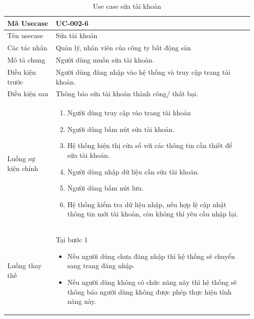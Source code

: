 \documentclass[12pt,a4paper]{article}
\begin{document}
    \begin{table}[H]
        \centering
        \begin{tabular}{|p{3.5cm}|p{11.5cm}|c|}
            \hline
            Mã Usecase      & UC-002-6                                                       \\
            \hline
            Tên usecase     & Sửa tài khoản                                                  \\
            \hline
            Các tác nhân    & Quản lý, nhân viên của công ty bất động sản                    \\
            \hline
            Mô tả chung     & Người dùng muốn sửa tài khoản.                                 \\
            \hline
            Điều kiện trước & Người dùng đăng nhập vào hệ thống và truy cập trang tài khoản. \\
            \hline
            Điều kiện sau   & Thông báo sửa tài khoản thành công/ thất bại.                  \\
            \hline
            Luồng sự kiện chính & \vspace{-.8cm}\begin{enumerate}
                                                    \item Người dùng truy cập vào trang tài khoản
                                                    \item  Người dùng bấm nút sửa tài khoản.
                                                    \item  Hệ thống hiện thị cửa sổ với các thông tin cần thiết để sửa tài khoản.
                                                    \item  Người dùng nhập dữ liệu cần sửa tài khoản.
                                                    \item Người dùng bấm nút lưu.
                                                    \item Hệ thống kiểm tra dữ liệu nhập, nếu hợp lệ cập nhật thông tin mới tài khoản, còn không thì yêu cầu nhập lại.
            \end{enumerate}
            \\
            \hline
            Luồng thay thế & Tại bước 1\newline
            \vspace{-.8cm}\begin{itemize}
                              \item Nếu người dùng chưa đăng nhập thì hệ thống sẽ chuyển sang trang đăng nhập.
                              \item  Nếu người dùng không có chức năng này thì hệ thống sẽ thông báo người dùng không được phép thực hiện tính năng này.
            \end{itemize}
            \\
            \hline
        \end{tabular}
        \caption{Use case sửa tài khoản }
    \end{table}
\end{document}
